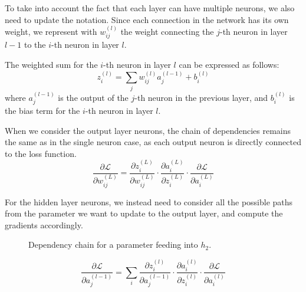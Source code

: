 To take into account the fact that each layer can have multiple neurons, we also need to update the notation. Since each connection in the network has its own weight,
we represent with $w_{ij}^{(l)}$ the weight connecting the $j$-th neuron in layer $l-1$ to the $i$-th neuron in layer $l$.

The weighted sum for the $i$-th neuron in layer $l$ can be expressed as follows:
\begin{equation*}
    z_i^{(l)} = \sum_{j} w_{ij}^{(l)} a_j^{(l-1)} + b_i^{(l)}
\end{equation*}
where $a_j^{(l-1)}$ is the output of the $j$-th neuron in the previous layer, and $b_i^{(l)}$ is the bias term for the $i$-th neuron in layer $l$.

When we consider the output layer neurons, the chain of dependencies remains the same as in the single neuron case, as each output neuron is directly connected to the loss function.
\begin{equation*}
    \frac{\partial \mathcal{L}}{\partial w_{ij}^{(L)}} = \frac{\partial z_i^{(L)}}{\partial w_{ij}^{(L)}} \cdot \frac{\partial a_i^{(L)}}{\partial z_i^{(L)}} \cdot \frac{\partial \mathcal{L}}{\partial a_i^{(L)}}
\end{equation*}

For the hidden layer neurons, we instead need to consider all the possible paths from the parameter we want to update to the output layer, and compute the gradients accordingly.
\begin{figure}[H]
    \centering
    \scalebox{0.5}{}
    \caption{Dependency chain for a parameter feeding into $h_2$.}
    \label{fig:backpropagation_output}
\end{figure}
\begin{equation*}
    \frac{\partial \mathcal{L}}{\partial a_j^{(l-1)}} = \sum_{i} \frac{\partial z_i^{(l)}}{\partial a_j^{(l-1)}} \cdot \frac{\partial a_i^{(l)}}{\partial z_i^{(l)}} \cdot \frac{\partial \mathcal{L}}{\partial a_i^{(l)}}
\end{equation*}